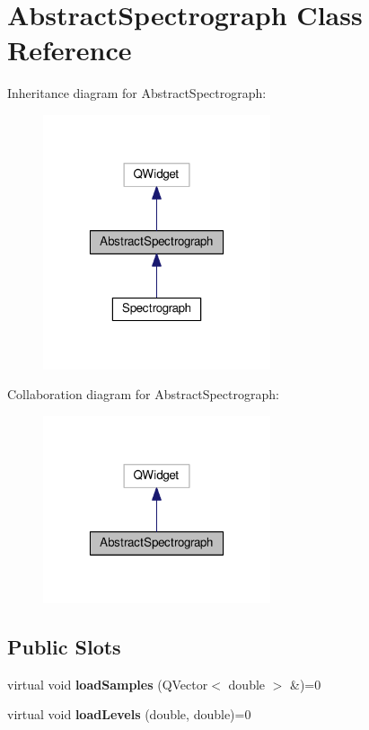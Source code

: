 \hypertarget{class_abstract_spectrograph}{\section{Abstract\-Spectrograph Class Reference}
\label{class_abstract_spectrograph}
}


Inheritance diagram for Abstract\-Spectrograph\-:
\nopagebreak
\begin{figure}[H]
\begin{center}
\leavevmode
\includegraphics[width=190pt]{class_abstract_spectrograph__inherit__graph}
\end{center}
\end{figure}


Collaboration diagram for Abstract\-Spectrograph\-:
\nopagebreak
\begin{figure}[H]
\begin{center}
\leavevmode
\includegraphics[width=190pt]{class_abstract_spectrograph__coll__graph}
\end{center}
\end{figure}
\subsection*{Public Slots}
\begin{DoxyCompactItemize}
\item 
\hypertarget{class_abstract_spectrograph_a63839b1e9464f8000a9469f013a6e30c}{virtual void {\bfseries load\-Samples} (Q\-Vector$<$ double $>$ \&)=0}\label{class_abstract_spectrograph_a63839b1e9464f8000a9469f013a6e30c}

\item 
\hypertarget{class_abstract_spectrograph_a04da5584e18bbd8954d9daef88418daa}{virtual void {\bfseries load\-Levels} (double, double)=0}\label{class_abstract_spectrograph_a04da5584e18bbd8954d9daef88418daa}

\end{DoxyCompactItemize}
